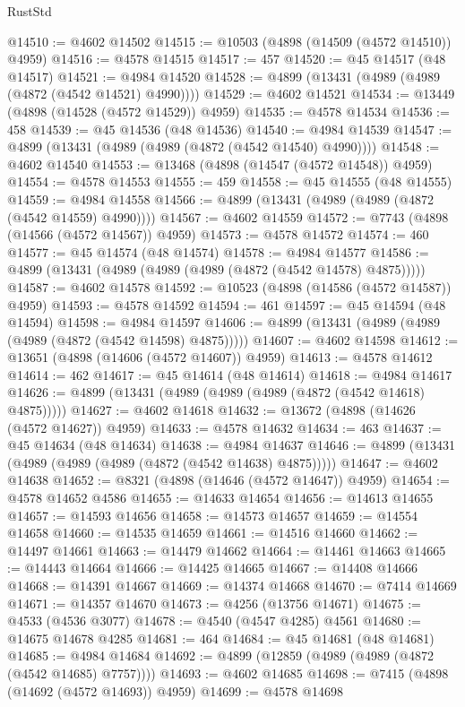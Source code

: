 \begin{lexlean}{RustStd}
\begin{coremodule}
@14510 := @4602 @14502
@14515 := @10503 (@4898 (@14509 (@4572 @14510)) @4959)
@14516 := @4578 @14515
@14517 := 457
@14520 := @45 @14517 (@48 @14517)
@14521 := @4984 @14520
@14528 := @4899 (@13431 (@4989 (@4989 (@4872 (@4542 @14521) @4990))))
@14529 := @4602 @14521
@14534 := @13449 (@4898 (@14528 (@4572 @14529)) @4959)
@14535 := @4578 @14534
@14536 := 458
@14539 := @45 @14536 (@48 @14536)
@14540 := @4984 @14539
@14547 := @4899 (@13431 (@4989 (@4989 (@4872 (@4542 @14540) @4990))))
@14548 := @4602 @14540
@14553 := @13468 (@4898 (@14547 (@4572 @14548)) @4959)
@14554 := @4578 @14553
@14555 := 459
@14558 := @45 @14555 (@48 @14555)
@14559 := @4984 @14558
@14566 := @4899 (@13431 (@4989 (@4989 (@4872 (@4542 @14559) @4990))))
@14567 := @4602 @14559
@14572 := @7743 (@4898 (@14566 (@4572 @14567)) @4959)
@14573 := @4578 @14572
@14574 := 460
@14577 := @45 @14574 (@48 @14574)
@14578 := @4984 @14577
@14586 := @4899 (@13431 (@4989 (@4989 (@4989 (@4872 (@4542 @14578) @4875)))))
@14587 := @4602 @14578
@14592 := @10523 (@4898 (@14586 (@4572 @14587)) @4959)
@14593 := @4578 @14592
@14594 := 461
@14597 := @45 @14594 (@48 @14594)
@14598 := @4984 @14597
@14606 := @4899 (@13431 (@4989 (@4989 (@4989 (@4872 (@4542 @14598) @4875)))))
@14607 := @4602 @14598
@14612 := @13651 (@4898 (@14606 (@4572 @14607)) @4959)
@14613 := @4578 @14612
@14614 := 462
@14617 := @45 @14614 (@48 @14614)
@14618 := @4984 @14617
@14626 := @4899 (@13431 (@4989 (@4989 (@4989 (@4872 (@4542 @14618) @4875)))))
@14627 := @4602 @14618
@14632 := @13672 (@4898 (@14626 (@4572 @14627)) @4959)
@14633 := @4578 @14632
@14634 := 463
@14637 := @45 @14634 (@48 @14634)
@14638 := @4984 @14637
@14646 := @4899 (@13431 (@4989 (@4989 (@4989 (@4872 (@4542 @14638) @4875)))))
@14647 := @4602 @14638
@14652 := @8321 (@4898 (@14646 (@4572 @14647)) @4959)
@14654 := @4578 @14652 @4586
@14655 := @14633 @14654
@14656 := @14613 @14655
@14657 := @14593 @14656
@14658 := @14573 @14657
@14659 := @14554 @14658
@14660 := @14535 @14659
@14661 := @14516 @14660
@14662 := @14497 @14661
@14663 := @14479 @14662
@14664 := @14461 @14663
@14665 := @14443 @14664
@14666 := @14425 @14665
@14667 := @14408 @14666
@14668 := @14391 @14667
@14669 := @14374 @14668
@14670 := @7414 @14669
@14671 := @14357 @14670
@14673 := @4256 (@13756 @14671)
@14675 := @4533 (@4536 @3077)
@14678 := @4540 (@4547 @4285) @4561
@14680 := @14675 @14678 @4285
@14681 := 464
@14684 := @45 @14681 (@48 @14681)
@14685 := @4984 @14684
@14692 := @4899 (@12859 (@4989 (@4989 (@4872 (@4542 @14685) @7757))))
@14693 := @4602 @14685
@14698 := @7415 (@4898 (@14692 (@4572 @14693)) @4959)
@14699 := @4578 @14698

\end{coremodule}
\end{lexlean}
